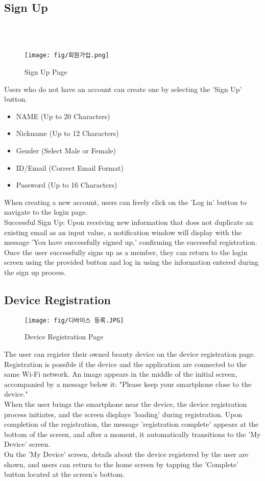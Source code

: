 \documentclass[conference]{IEEEtran}
\begin{document}
\subsection{Sign Up} \\ \\
    \begin{figure}[h]
    \centering
    \texttt{[image: fig/회원가입.png]}
    \label{fig:Sign Up Page}
    \caption{Sign Up Page} 
    \end{figure}
Users who do not have an account can create one by selecting the 'Sign Up' button.
\begin{itemize}
    \item NAME (Up to 20 Characters)
    \item Nickname (Up to 12 Characters)
    \item Gender (Select Male or Female)
    \item ID/Email (Correct Email Format)
    \item Password (Up to 16 Characters)
\end{itemize}
When creating a new account, users can freely click on the 'Log in' button to navigate to the login page. \\
Successful Sign Up: Upon receiving new information that does not duplicate an existing email as an input value, a notification window will display with the message 'You have successfully signed up,' confirming the successful registration. Once the user successfully signs up as a member, they can return to the login screen using the provided button and log in using the information entered during the sign up process.\\

\clearpage
\subsection{Device Registration}
    \begin{figure}[h]
    \centering
    \texttt{[image: fig/디바이스 등록.JPG]}
    \label{fig:Device Registration Page}
    \caption{Device Registration Page} 
    \end{figure}
The user can register their owned beauty device on the device registration page. Registration is possible if the device and the application are connected to the same Wi-Fi network. An image appears in the middle of the initial screen, accompanied by a message below it: "Please keep your smartphone close to the device."\\
When the user brings the smartphone near the device, the device registration process initiates, and the screen displays 'loading' during registration. Upon completion of the registration, the message 'registration complete' appears at the bottom of the screen, and after a moment, it automatically transitions to the 'My Device' screen.\\
On the 'My Device' screen, details about the device registered by the user are shown, and users can return to the home screen by tapping the 'Complete' button located at the screen's bottom.\\
    
\end{document}
